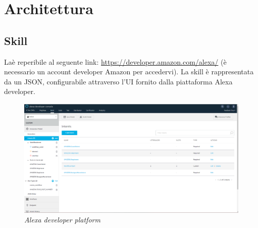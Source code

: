 \chapter{Architettura}
\section{Skill}\label{architetturaSkill}
Laè reperibile al seguente link: \url{https://developer.amazon.com/alexa/} (è necessario un account developer Amazon per accedervi). La skill è rappresentata da un JSON, configurabile attraverso l'UI fornito dalla piattaforma Alexa developer.
\begin{figure} [H]
    \centering
	\includegraphics[scale=0.2]{./images/SkillPage.PNG}
	\caption{\textit{Alexa developer platform}}\label{classlambda}
\end{figure}


